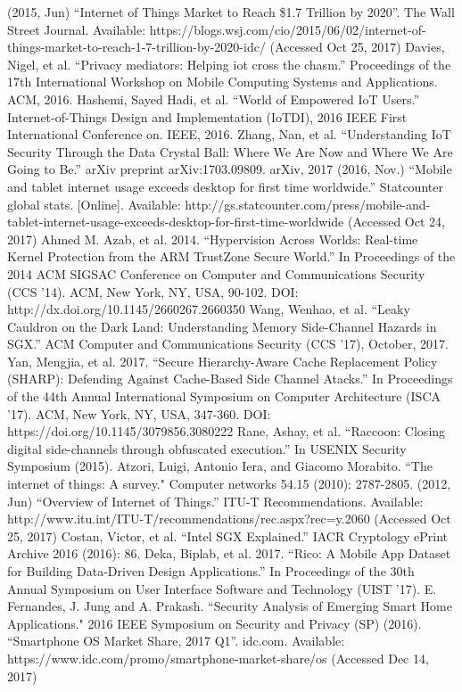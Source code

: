  (2015, Jun) ``Internet of Things Market to Reach \$1.7 Trillion by 2020''. The Wall Street Journal. Available: https://blogs.wsj.com/cio/2015/06/02/internet-of-things-market-to-reach-1-7-trillion-by-2020-idc/ (Accessed Oct 25, 2017)
 Davies, Nigel, et al. ``Privacy mediators: Helping iot cross the chasm.'' Proceedings of the 17th International Workshop on Mobile Computing Systems and Applications. ACM, 2016.
 Hashemi, Sayed Hadi, et al. ``World of Empowered IoT Users.'' Internet-of-Things Design and Implementation (IoTDI), 2016 IEEE First International Conference on. IEEE, 2016.
 Zhang, Nan, et al. ``Understanding IoT Security Through the Data Crystal Ball: Where We Are Now and Where We Are Going to Be.'' arXiv preprint arXiv:1703.09809. arXiv, 2017
 (2016, Nov.) ``Mobile and tablet internet usage exceeds desktop for first time worldwide.'' Statcounter global stats. [Online]. Available: http://gs.statcounter.com/press/mobile-and-tablet-internet-usage-exceeds-desktop-for-first-time-worldwide (Accessed Oct 24, 2017)
 Ahmed M. Azab, et al. 2014. ``Hypervision Across Worlds: Real-time Kernel Protection from the ARM TrustZone Secure World.'' In Proceedings of the 2014 ACM SIGSAC Conference on Computer and Communications Security (CCS '14). ACM, New York, NY, USA, 90-102. DOI: http://dx.doi.org/10.1145/2660267.2660350
 Wang, Wenhao, et al. ``Leaky Cauldron on the Dark Land: Understanding Memory Side-Channel Hazards in SGX.'' ACM Computer and Communications Security (CCS ’17), October, 2017.
 Yan, Mengjia, et al. 2017. ``Secure Hierarchy-Aware Cache Replacement Policy (SHARP): Defending Against Cache-Based Side Channel Atacks.'' In Proceedings of the 44th Annual International Symposium on Computer Architecture (ISCA '17). ACM, New York, NY, USA, 347-360. DOI: https://doi.org/10.1145/3079856.3080222
 Rane, Ashay, et al. ``Raccoon: Closing digital side-channels through obfuscated execution.'' In USENIX Security Symposium (2015).
 Atzori, Luigi, Antonio Iera, and Giacomo Morabito. ``The internet of things: A survey." Computer networks 54.15 (2010): 2787-2805.
 (2012, Jun) ``Overview of Internet of Things.'' ITU-T Recommendations. Available: http://www.itu.int/ITU-T/recommendations/rec.aspx?rec=y.2060 (Accessed Oct 25, 2017)
 Costan, Victor, et al. ``Intel SGX Explained.'' IACR Cryptology ePrint Archive 2016 (2016): 86.
 Deka, Biplab, et al. 2017. ``Rico: A Mobile App Dataset for Building Data-Driven Design Applications.'' In Proceedings of the 30th Annual Symposium on User Interface Software and Technology (UIST '17).
 E. Fernandes, J. Jung and A. Prakash. ``Security Analysis of Emerging Smart Home Applications." 2016 IEEE Symposium on Security and Privacy (SP) (2016).
 ``Smartphone OS Market Share, 2017 Q1''. idc.com. Available: https://www.idc.com/promo/smartphone-market-share/os (Accessed Dec 14, 2017)
